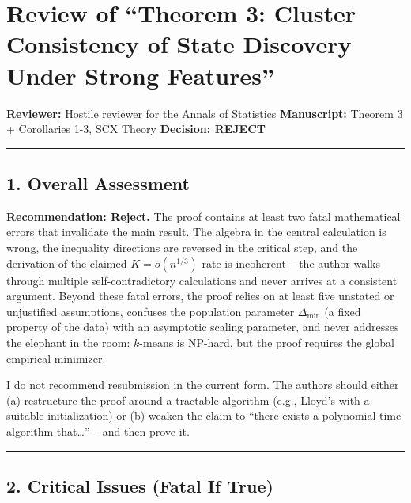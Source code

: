 \documentclass[
  12pt,
]{ctexart}
\author{SCX}
\date{2026}
\begin{document}
\section{Review of ``Theorem 3: Cluster Consistency of State Discovery
Under Strong
Features''}\label{review-of-theorem-3-cluster-consistency-of-state-discovery-under-strong-features}

\textbf{Reviewer:} Hostile reviewer for the Annals of Statistics
\textbf{Manuscript:} Theorem 3 + Corollaries 1-3, SCX Theory
\textbf{Decision: REJECT}

\begin{center}\rule{0.5\linewidth}{0.5pt}\end{center}

\subsection{1. Overall Assessment}\label{overall-assessment}

\textbf{Recommendation: Reject.} The proof contains at least two fatal
mathematical errors that invalidate the main result. The algebra in the
central calculation is wrong, the inequality directions are reversed in
the critical step, and the derivation of the claimed \(K = o(n^{1/3})\)
rate is incoherent -- the author walks through multiple
self-contradictory calculations and never arrives at a consistent
argument. Beyond these fatal errors, the proof relies on at least five
unstated or unjustified assumptions, confuses the population parameter
\(\Delta_{\min}\) (a fixed property of the data) with an asymptotic
scaling parameter, and never addresses the elephant in the room:
\(k\)-means is NP-hard, but the proof requires the global empirical
minimizer.

I do not recommend resubmission in the current form. The authors should
either (a) restructure the proof around a tractable algorithm (e.g.,
Lloyd's with a suitable initialization) or (b) weaken the claim to
``there exists a polynomial-time algorithm that\ldots{}'' -- and then
prove it.

\begin{center}\rule{0.5\linewidth}{0.5pt}\end{center}

\subsection{2. Critical Issues (Fatal If
True)}\label{critical-issues-fatal-if-true}
\end{document}
